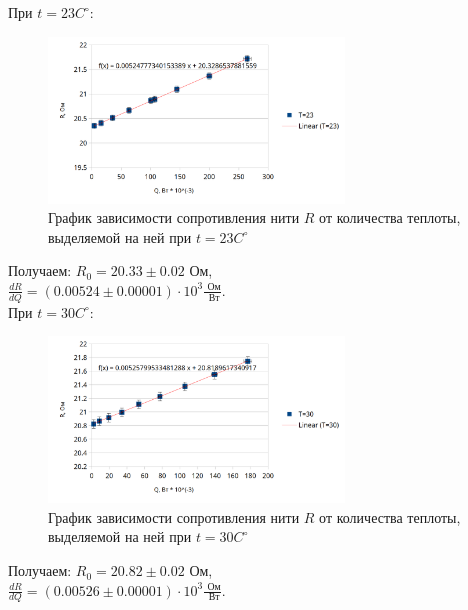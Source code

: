 \documentclass[a4paper]{article}
\begin{document}
При $t = 23C^\circ$:
\begin{figure}[ht]
    \centering
    \includegraphics[width=0.7\textwidth]{charts_R_Q/T_23.png}
    \caption{График зависимости сопротивления нити $R$ от количества теплоты, выделяемой на ней при $t = 23C^\circ$}
\end{figure}

Получаем:
$R_0 = 20.33 \pm 0.02\text{ Ом}$,\\

$\frac{dR}{dQ} = (0.00524 \pm 0.00001) \cdot 10^3 \frac{\text{ Ом}}{\text{ Вт}}$. \\


При $t = 30C^\circ$:
\begin{figure}[ht]
    \centering
    \includegraphics[width=0.7\textwidth]{charts_R_Q/T_30.png}
    \caption{График зависимости сопротивления нити $R$ от количества теплоты, выделяемой на ней при $t = 30C^\circ$}
\end{figure}

Получаем:
$R_0 = 20.82 \pm 0.02\text{ Ом}$,\\

$\frac{dR}{dQ} = (0.00526 \pm 0.00001) \cdot 10^3 \frac{\text{ Ом}}{\text{ Вт}}$. \\

\end{document}
